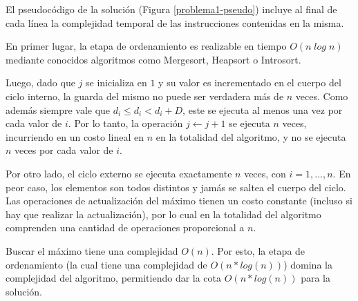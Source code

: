 El pseudocódigo de la solución (Figura \ref{problema1-pseudo}) incluye al final de cada línea la complejidad temporal de las instrucciones contenidas en la misma.

En primer lugar, la etapa de ordenamiento es realizable en tiempo $O(n\;log\;n)$ mediante conocidos algoritmos como Mergesort, Heapsort o Introsort.

Luego, dado que $j$ se inicializa en $1$ y su valor es incrementado en el cuerpo del ciclo interno, la guarda del mismo no puede ser verdadera más de $n$ veces. Como además siempre vale que $d_i \leq d_i < d_i + D$, este se ejecuta al menos una vez por cada valor de $i$. Por lo tanto, la operación $j \leftarrow j + 1$ se ejecuta $n$ veces, incurriendo en un costo lineal en $n$ en la totalidad del algoritmo, y no se ejecuta $n$ veces por cada valor de $i$.

Por otro lado, el ciclo externo se ejecuta exactamente $n$ veces, con $i = 1, ..., n$. En peor caso, los elementos son todos distintos y jamás se saltea el cuerpo del ciclo. Las operaciones de actualización del máximo tienen un costo constante (incluso si hay que realizar la actualización), por lo cual en la totalidad del algoritmo comprenden una cantidad de operaciones proporcional a $n$.

Buscar el máximo tiene una complejidad $O(n)$. Por esto, la etapa de ordenamiento (la cual tiene una complejidad de $O(n*log(n))$) domina la complejidad del algoritmo, permitiendo dar la cota $O(n*log(n))$ para la solución.